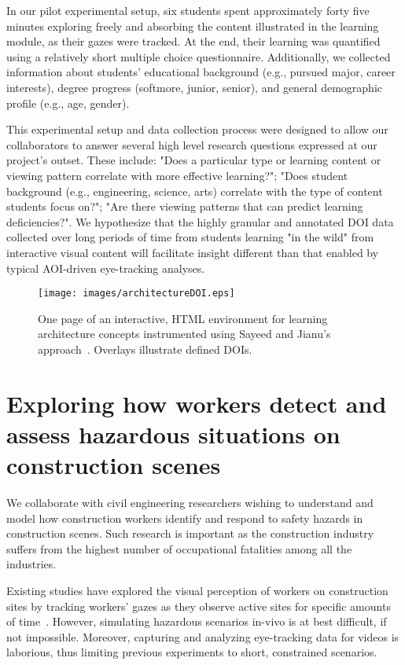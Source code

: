 In our pilot experimental setup, six students spent approximately forty five minutes exploring freely and absorbing the content illustrated in the learning module, as their gazes were tracked. At the end, their learning was quantified using a relatively short multiple choice questionnaire. Additionally, we collected information about students' educational background (e.g., pursued major, career interests), degree progress (softmore, junior, senior), and general demographic profile (e.g., age, gender).

This experimental setup and data collection process were designed to allow our collaborators to answer several high level research questions expressed at our project's outset. These include: "Does a particular type or learning content or viewing pattern correlate with more effective learning?"; "Does student background (e.g., engineering, science, arts) correlate with the type of content students focus on?"; "Are there viewing patterns that can predict learning deficiencies?". We hypothesize that the highly granular and annotated DOI data collected over long periods of time from students learning "in the wild" from interactive visual content will facilitate insight different than that enabled by typical AOI-driven eye-tracking analyses.

\begin{figure}[htbp]
  \centering
  \texttt{[image: images/architectureDOI.eps]}
  \caption{One page of an interactive, HTML environment for learning architecture concepts instrumented using Sayeed and Jianu's approach~\cite{Ala16}. Overlays illustrate defined DOIs.}
	\label{fig:archictecture}
\end{figure}

\section{Exploring how workers detect and assess hazardous situations on construction scenes}

We collaborate with civil engineering researchers wishing to understand and model how construction workers identify and respond to safety hazards in construction scenes. Such research is important as the construction  industry  suffers  from the  highest  number  of  occupational  fatalities  among  all  the  industries. 

Existing studies have explored the visual perception of workers on construction sites by tracking workers' gazes as they observe active sites for specific amounts of time~\cite{SafetyPerf}. However, simulating hazardous scenarios in-vivo is at best difficult, if not impossible. 
Moreover, capturing and analyzing eye-tracking data for videos is laborious, thus limiting previous experiments to short, constrained scenarios. 

